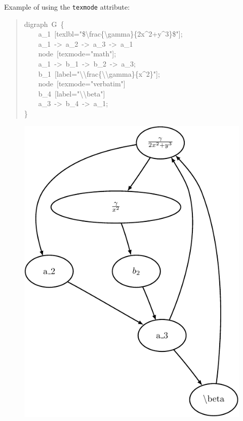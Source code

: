 \documentclass[10pt,a4paper,english]{article}
\begin{document}
Example of using the \texttt{texmode} attribute:
\begin{quote}{\ttfamily \raggedright \noindent
digraph~G~{\{}~\\
~~~~a{\_}1~{[}texlbl="{\$}{\textbackslash}frac{\{}{\textbackslash}gamma{\}}{\{}2x{\textasciicircum}2+y{\textasciicircum}3{\}}{\$}"{]};~\\
~~~~a{\_}1~->~a{\_}2~->~a{\_}3~->~a{\_}1~\\
~~~~node~{[}texmode="math"{]};~\\
~~~~a{\_}1~->~b{\_}1~->~b{\_}2~->~a{\_}3;~\\
~~~~b{\_}1~{[}label="{\textbackslash}{\textbackslash}frac{\{}{\textbackslash}{\textbackslash}gamma{\}}{\{}x{\textasciicircum}2{\}}"{]};~\\
~~~~node~{[}texmode="verbatim"{]}~\\
~~~~b{\_}4~{[}label="{\textbackslash}{\textbackslash}beta"{]}~\\
~~~~a{\_}3~->~b{\_}4~->~a{\_}1;~\\
{\}}
}\end{quote}
\begin{figure}[H]
\centering

\includegraphics{pdf/texmode}
\end{figure}
\end{document}

